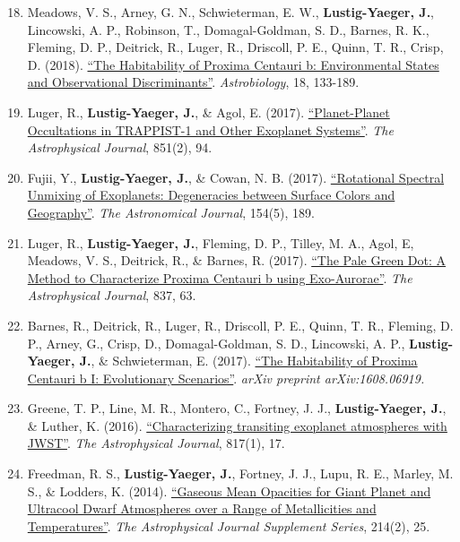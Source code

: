 \documentclass[margin,10pt]{res}
\newenvironment{benumerate}[1]{
    \let\oldItem\item
    \def\item{\addtocounter{enumi}{-2}\oldItem}
    \begin{enumerate}
    \setcounter{enumi}{#1}
    \addtocounter{enumi}{1}
}{
    \end{enumerate}
}
\begin{document}
\begin{resume}
\begin{benumerate}{17}
                    \item Meadows, V. S., Arney, G. N., Schwieterman, E. W., \textbf{Lustig-Yaeger, J.}, Lincowski, A. P., Robinson, T.,  Domagal-Goldman, S. D., Barnes, R. K., Fleming, D. P., Deitrick, R., Luger, R., Driscoll, P. E., Quinn, T. R., Crisp, D. (2018). \href{http://adsabs.harvard.edu/abs/2018AsBio..18..133M}{``The Habitability of Proxima Centauri b: Environmental States and Observational Discriminants''}. \textit{Astrobiology}, 18, 133-189.
                    \item Luger, R., \textbf{Lustig-Yaeger, J.}, \& Agol, E. (2017).  \href{http://adsabs.harvard.edu/abs/2017ApJ...851...94L}{``Planet-Planet Occultations in TRAPPIST-1 and Other Exoplanet Systems''}. \textit{The Astrophysical Journal}, 851(2), 94.
                    \item Fujii, Y., \textbf{Lustig-Yaeger, J.}, \& Cowan, N. B. (2017). \href{http://adsabs.harvard.edu/abs/2017arXiv170804886F}{``Rotational Spectral Unmixing of Exoplanets: Degeneracies between Surface Colors and Geography''}. \textit{The Astronomical Journal}, 154(5), 189.
                    \item Luger, R., \textbf{Lustig-Yaeger, J.}, Fleming, D. P., Tilley, M. A., Agol, E, Meadows, V. S., Deitrick, R., \& Barnes, R. (2017). \href{http://adsabs.harvard.edu/abs/2017ApJ...837...63L}{``The Pale Green Dot: A Method to Characterize Proxima Centauri b using Exo-Aurorae''}. \textit{The Astrophysical Journal}, 837, 63.
                    \item Barnes, R., Deitrick, R., Luger, R., Driscoll, P. E., Quinn, T. R., Fleming, D. P., Arney, G., Crisp, D., Domagal-Goldman, S. D., Lincowski, A. P., \textbf{Lustig-Yaeger, J.}, \& Schwieterman, E. (2017). \href{http://adsabs.harvard.edu/cgi-bin/bib_query?arXiv:1608.06919}{``The Habitability of Proxima Centauri b I: Evolutionary Scenarios''}. \textit{arXiv preprint arXiv:1608.06919.}
                    \item Greene, T. P., Line, M. R., Montero, C., Fortney, J. J., \textbf{Lustig-Yaeger, J.}, \& Luther, K. (2016). \href{http://adsabs.harvard.edu/abs/2016ApJ...817...17G}{``Characterizing transiting exoplanet atmospheres with JWST''}. \textit{The Astrophysical Journal}, 817(1), 17.
                    \item Freedman, R. S., \textbf{Lustig-Yaeger, J.}, Fortney, J. J., Lupu, R. E., Marley, M. S., \& Lodders, K. (2014). \href{http://adsabs.harvard.edu/abs/2014ApJS..214...25F}{``Gaseous Mean Opacities for Giant Planet and Ultracool Dwarf Atmospheres over a Range of Metallicities and Temperatures''}. \textit{The Astrophysical Journal Supplement Series}, 214(2), 25.\\

\end{benumerate}
\end{resume}
\end{document}
